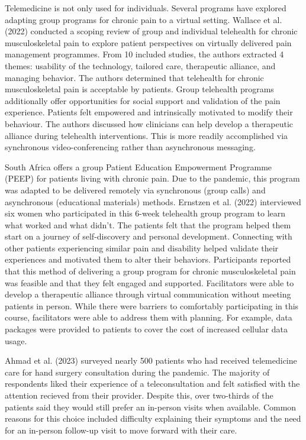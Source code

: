 \documentclass[
  letterpaper,
  DIV=11,
  numbers=noendperiod,
  oneside]{scrartcl}
\begin{document}
Telemedicine is not only used for individuals. Several programs have
explored adapting group programs for chronic pain to a virtual setting.
Wallace et al. (2022) conducted a scoping review of group and individual
telehealth for chronic musculoskeletal pain to explore patient
perspectives on virtually delivered pain management programmes. From 10
included studies, the authors extracted 4 themes: usability of the
technology, tailored care, therapeutic alliance, and managing behavior.
The authors determined that telehealth for chronic musculoskeletal pain
is acceptable by patients. Group telehealth programs additionally offer
opportunities for social support and validation of the pain experience.
Patients felt empowered and intrinsically motivated to modify their
behaviour. The authors discussed how clinicians can help develop a
therapeutic alliance during telehealth interventions. This is more
readily accomplished via synchronous video-conferencing rather than
asynchronous messaging.

South Africa offers a group Patient Education Empowerment Programme
(PEEP) for patients living with chronic pain. Due to the pandemic, this
program was adapted to be delivered remotely via synchronous (group
calls) and asynchronous (educational materials) methods. Ernstzen et al.
(2022) interviewed six women who participated in this 6-week telehealth
group program to learn what worked and what didn't. The patients felt
that the program helped them start on a journey of self-discovery and
personal development. Connecting with other patients experiencing
similar pain and disability helped validate their experiences and
motivated them to alter their behaviors. Participants reported that this
method of delivering a group program for chronic musculoskeletal pain
was feasible and that they felt engaged and supported. Facilitators were
able to develop a therapeutic alliance through virtual communication
without meeting patients in person. While there were barriers to
comfortably participating in this course, facilitators were able to
address them with planning. For example, data packages were provided to
patients to cover the cost of increased cellular data usage.

Ahmad et al. (2023) surveyed nearly 500 patients who had received
telemedicine care for hand surgery consultation during the pandemic. The
majority of respondents liked their experience of a teleconsultation and
felt satisfied with the attention recieved from their provider. Despite
this, over two-thirds of the patients said they would still prefer an
in-person visits when available. Common reasons for this choice included
difficulty explaining their symptoms and the need for an in-person
follow-up visit to move forward with their care.
\end{document}
